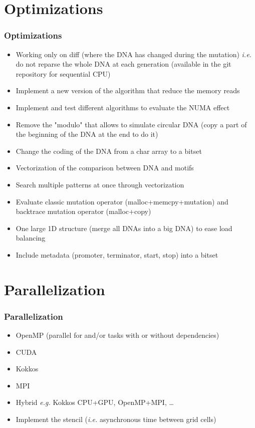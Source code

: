 \documentclass{beamer}
\begin{document}
\section{Optimizations}
\begin{frame}
 \frametitle{Optimizations}
 \begin{itemize}
  \item Working only on diff (where the DNA has changed during the mutation) \textit{i.e.} do not reparse the whole DNA at each generation (available in the git repository for sequential CPU)
  \item Implement a new version of the algorithm that reduce the memory reads
  \item Implement and test different algorithms to evaluate the NUMA effect
  \vfill
  \item Remove the "modulo" that allows to simulate circular DNA (copy a part of the beginning of the DNA at the end to do it)
  \item Change the coding of the DNA from a char array to a bitset
  \vfill
  \item Vectorization of the comparison between DNA and motifs
  \item Search multiple patterns at once through vectorization
  \vfill
  \item Evaluate classic mutation operator (malloc+memcpy+mutation) and backtrace mutation operator (malloc+copy)
  \vfill
  \item One large 1D structure (merge all DNAs into a big DNA) to ease load balancing
  \vfill
  \item Include metadata (promoter, terminator, start, stop) into a bitset
 \end{itemize}
\end{frame}

\section{Parallelization}
\begin{frame}
 \frametitle{Parallelization}
 \begin{itemize}
  \item OpenMP (parallel for and/or tasks with or without dependencies)
  \item CUDA
  \item Kokkos
  \item MPI
  \item Hybrid \textit{e.g.} Kokkos CPU+GPU, OpenMP+MPI, \ldots
  \vfill
  \item Implement the stencil (\textit{i.e.} asynchronous time between grid cells)
 \end{itemize}
\end{frame}
\end{document}

